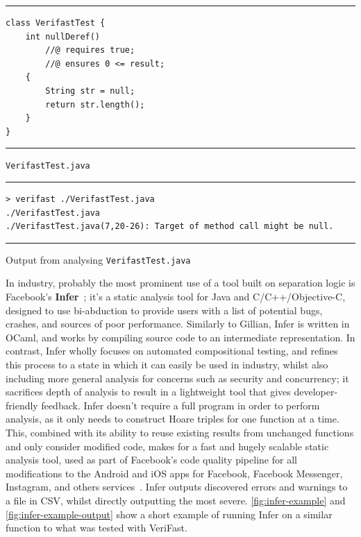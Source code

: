 \begin{listing}[!ht]
  \noindent\rule{\textwidth}{0.5pt}
  \begin{verbatim}
class VerifastTest {
    int nullDeref()
        //@ requires true;
        //@ ensures 0 <= result;
    {
        String str = null;
        return str.length();
    }
}
  \end{verbatim}
  \noindent\rule{\textwidth}{0.5pt}
  \caption{\texttt{VerifastTest.java}}
  \label{fig:verifast-example}
\end{listing}

\begin{listing}[!ht]
  \noindent\rule{\textwidth}{0.5pt}
  \begin{verbatim}
> verifast ./VerifastTest.java
./VerifastTest.java
./VerifastTest.java(7,20-26): Target of method call might be null.
  \end{verbatim}
  \noindent\rule{\textwidth}{0.5pt}
  \caption{Output from analysing \texttt{VerifastTest.java}}
  \label{fig:verifast-example-output}
\end{listing}

In industry, probably the most prominent use of a tool built on separation logic is Facebook's \textbf{Infer}~\cite{infer, infer-site}; it's a static analysis
tool for Java and C/C++/Objective-C, designed to use bi-abduction to provide
users with a list of potential bugs, crashes, and sources of poor performance.
Similarly to Gillian, Infer is written in OCaml, and works by compiling source
code to an intermediate representation. In contrast, Infer wholly focuses on
automated compositional testing, and refines this process to a state in which
it can easily be used in industry, whilst also including more general analysis
for concerns such as security and concurrency; it sacrifices depth of analysis
to result in a lightweight tool that gives developer-friendly feedback.
Infer doesn't require a full program in order to perform analysis, as it only
needs to construct Hoare triples for one function at a time. This, combined with
its ability to reuse existing results from unchanged functions and only consider
modified code, makes for a fast and hugely scalable static analysis tool, used
as part of Facebook's code quality pipeline for all modifications to the Android
and iOS apps for Facebook, Facebook Messenger, Instagram, and others
services~\cite{infer-about}. Infer outputs discovered errors and warnings to a
file in CSV, whilst directly outputting the most severe.
\autoref{fig:infer-example} and \autoref{fig:infer-example-output} show a short
example of running Infer on a similar function to what was tested with VeriFast.

